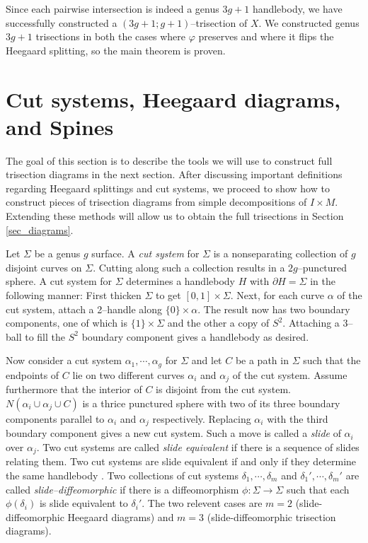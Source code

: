 \documentclass[12pt]{amsart}
\newcommand{\del}{\partial }
\theoremstyle{definition}
\theoremstyle{remark}
\begin{document}
Since each pairwise intersection is indeed a genus $3g+1$ handlebody, we have successfully constructed a $(3g+1;g+1)$--trisection of $X$.  We constructed genus $3g+1$ trisections in both the cases where $\varphi$ preserves and where it flips the Heegaard splitting, so the main theorem is proven.

\section{Cut systems, Heegaard diagrams, and Spines}
\label{sec_cutsystems}

The goal of this section is to describe the tools we will use to construct full trisection diagrams in the next section.  After discussing important definitions regarding Heegaard splittings and cut systems, we proceed to show how to construct pieces of trisection diagrams from simple decompositions of $I \times M$.  Extending these methods will allow us to obtain the full trisections in Section \ref{sec_diagrams}.

Let $\Sigma$ be a genus $g$ surface.  A \emph{cut system} for $\Sigma$ is a nonseparating collection of $g$ disjoint curves on $\Sigma$.  Cutting along such a collection results in a $2g$--punctured sphere.  A cut system for $\Sigma$ determines a handlebody $H$ with $\del H = \Sigma$ in the following manner:  First thicken $\Sigma$ to get $[0,1] \times \Sigma$.  Next, for each curve $\alpha$ of the cut system, attach a 2--handle along $\{0\} \times \alpha$.  The result now has two boundary components, one of which is $\{1\} \times \Sigma$ and the other a copy of $S^2$.  Attaching a 3--ball to fill the $S^2$ boundary component gives a handlebody as desired.

Now consider a cut system $\alpha_1,\cdots,\alpha_g$ for $\Sigma$ and let $C$ be a path in $\Sigma$ such that the endpoints of $C$ lie on two different curves $\alpha_i$ and $\alpha_j$ of the cut system.  Assume furthermore that the interior of $C$ is disjoint from the cut system.  $N(\alpha_i \cup \alpha_j \cup C)$ is a thrice punctured sphere with two of its three boundary components parallel to $\alpha_i$ and $\alpha_j$ respectively.  Replacing $\alpha_i$ with the third boundary component gives a new cut system.  Such a move is called a \emph{slide} of $\alpha_i$ over $\alpha_j$.  Two cut systems are called \emph{slide equivalent} if there is a sequence of slides relating them.  Two cut systems are slide equivalent if and only if they determine the same handlebody \cite{Johannson1}.  Two collections of cut systems $\delta_1,\cdots,\delta_m$ and $\delta_1',\cdots,\delta_m'$ are called \emph{slide--diffeomorphic} if there is a diffeomorphism $\phi\colon \Sigma \to \Sigma$ such that each $\phi(\delta_i)$ is slide equivalent to $\delta_i '$.  The two relevent cases are $m=2$ (slide-diffeomorphic Heegaard diagrams) and $m=3$ (slide-diffeomorphic trisection diagrams).
\end{document}

